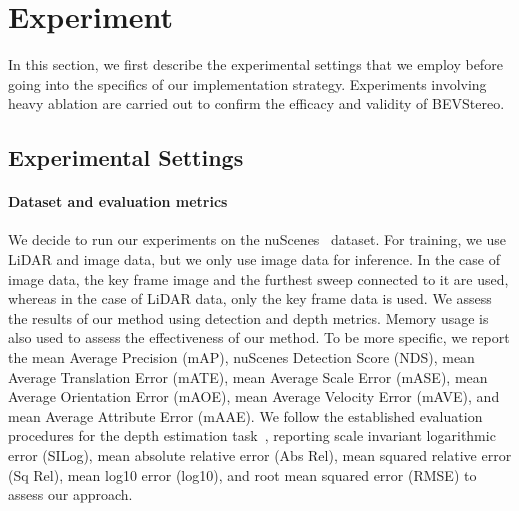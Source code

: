\documentclass[letterpaper]{article} \usepackage[]{aaai23}  \usepackage{times}  \usepackage{helvet}  \usepackage{courier}  \usepackage[hyphens]{url}  \usepackage{graphicx} \urlstyle{rm} \def\UrlFont{\rm}  \usepackage{natbib}  \usepackage{caption} \frenchspacing  \setlength{\pdfpagewidth}{8.5in} \setlength{\pdfpageheight}{11in} \usepackage{algorithm}
\begin{document}
\begin{table}[h!]
\centering
{}
\caption{Detection results on the nuScenes \emph{val} set. CA denotes class-agnostic. All results are conducted under the best hyper parameters.}
\label{tab:circlenms}
\end{table}




\section{Experiment}
In this section, we first describe the experimental settings that we employ before going into the specifics of our implementation strategy. Experiments involving heavy ablation are carried out to confirm the efficacy and validity of BEVStereo.




\subsection{Experimental Settings}
\paragraph{Dataset and evaluation metrics}
We decide to run our experiments on the nuScenes~\cite{caesar2020nuscenes} dataset. For training, we use LiDAR and image data, but we only use image data for inference. In the case of image data, the key frame image and the furthest sweep connected to it are used, whereas in the case of LiDAR data, only the key frame data is used. We assess the results of our method using detection and depth metrics. Memory usage is also used to assess the effectiveness of our method. To be more specific, we report the mean Average Precision (mAP), nuScenes Detection Score (NDS), mean Average Translation Error (mATE), mean Average Scale Error (mASE), mean Average Orientation Error (mAOE), mean Average Velocity Error (mAVE), and mean Average Attribute Error (mAAE). We follow the established evaluation procedures for the depth estimation task~\cite{deptheval}, reporting scale invariant logarithmic error (SILog), mean absolute relative error (Abs Rel), mean squared relative error (Sq Rel), mean log10 error (log10), and root mean squared error (RMSE) to assess our approach.
\end{document}
